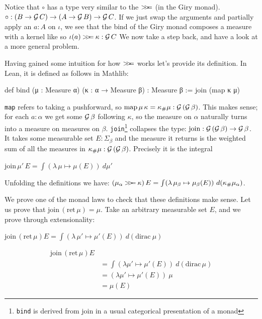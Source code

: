 Notice that $\circ$ has a type very similar to the $\mathbin{>\!\!>\mkern-6.7mu=}$ (in the Giry monad).
$\circ : (B \to \mathcal{G}\, C) \to (A \to \mathcal{G}\, B) \to \mathcal{G}\, C$. If we just swap the arguments and partially apply an $a : A$ on $\iota$, we see
that the bind of the Giry monad composes a measure with a kernel like so $\iota(a) \mathbin{>\!\!>\mkern-6.7mu=} \kappa : \mathcal{G}\, C$
We now take a step back, and have a look at a more general problem.

Having gained some intuition for how $\mathbin{>\!\!>\mkern-6.7mu=}$ works let's provide its definition. In Lean, it is defined as follows in Mathlib:

\begin{leancode}
def bind (μ : Measure α) (κ : α → Measure β) : Measure β :=
  join (map κ μ)
\end{leancode}

\texttt{map} refers to taking a pushforward, so $\mathrm{map}\, \mu\, \kappa = \kappa_\#\mu : \mathcal{G}\, (\mathcal{G}\, \beta)$. This makes sense; for each $a : \alpha$ we get some $\mathcal{G}\, \beta$ following $\kappa$, so the measure on $\alpha$
naturally turns into a measure on measures on $\beta$. \texttt{join}\footnote{\texttt{bind} is derived from join in a usual categorical presentation of a monad} collapses the type: $\mathrm{join} : \mathcal{G}\, (\mathcal{G}\, \beta) \to \mathcal{G}\, \beta$.
It takes some measurable set $E : \Sigma_\beta$ and the measure it
returns is the weighted sum of all the measures in $\kappa_\#\mu : \mathcal{G}\, (\mathcal{G}\, \beta)$. Precisely it is the integral

$\mathrm{join}\, \mu'\, E = \int (\lambda\, \mu \mapsto \mu(E))\ d\mu'$

Unfolding the definitions we have:
$(\mu_\alpha \mathbin{>\!\!>\mkern-6.7mu=} \kappa)\, E = \int (\lambda\, \mu_\beta \mapsto \mu_\beta(E))\ d(\kappa_\#\mu_\alpha)$.

We prove one of the monad laws to check that these definitions make sense. Let us prove that $\mathrm{join}\, (\mathrm{ret}\, \mu) = \mu$. Take an arbitrary measurable set $E$, and we prove through
extensionality:

$\mathrm{join}\, (\mathrm{ret}\, \mu) E = \int (\lambda\, \mu' \mapsto \mu'(E))\ d(\mathrm{dirac}\ \mu)$

\[
\begin{aligned}
\mathrm{join}\, (\mathrm{ret}\, \mu) E \\ 
&= \int (\lambda \mu' \mapsto \mu'(E))\ d(\mathrm{dirac}\, \mu) \\
&= (\lambda \mu' \mapsto \mu'(E))\ \mu \\
&= \mu(E)
\end{aligned}
\]

